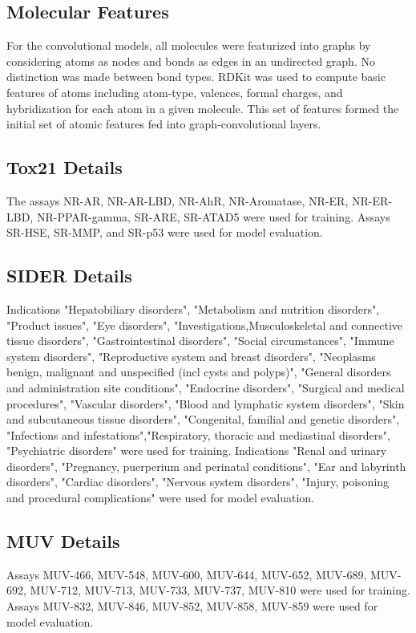 \documentclass[journal=jacsat,manuscript=article]{achemso}
\begin{document}
\subsection{Molecular Features}

For the convolutional models, all molecules were featurized into graphs by considering atoms as nodes and bonds as edges in an undirected graph. No distinction was made between bond types. RDKit \cite{landrum2016} was used to compute basic features of atoms including atom-type, valences, formal charges, and hybridization for each atom in a given molecule. This set  of features formed the initial set of atomic features fed into graph-convolutional layers. 

\subsection{Tox21 Details}

The assays NR-AR, NR-AR-LBD, NR-AhR, NR-Aromatase, NR-ER, NR-ER-LBD, NR-PPAR-gamma, SR-ARE, SR-ATAD5 were used for training. Assays SR-HSE, SR-MMP, and SR-p53 were used for model evaluation.

\subsection{SIDER Details}
Indications "Hepatobiliary disorders", "Metabolism and nutrition disorders", "Product issues", "Eye disorders", "Investigations,Musculoskeletal and connective tissue disorders", "Gastrointestinal disorders", "Social circumstances", "Immune system disorders", "Reproductive system and breast disorders", "Neoplasms benign, malignant and unspecified (incl cysts and polyps)", "General disorders and administration site conditions", "Endocrine disorders", "Surgical and medical procedures", "Vascular disorders", "Blood and lymphatic system disorders", "Skin and subcutaneous tissue disorders", "Congenital, familial and genetic disorders", "Infections and infestations","Respiratory, thoracic and mediastinal disorders", "Psychiatric disorders" were used for training. Indications "Renal and urinary disorders", "Pregnancy, puerperium and perinatal conditions", "Ear and labyrinth disorders", "Cardiac disorders", "Nervous system disorders", "Injury, poisoning and procedural complications" were used for model evaluation.

\subsection{MUV Details}
Assays MUV-466, MUV-548, MUV-600, MUV-644, MUV-652, MUV-689, MUV-692, MUV-712, MUV-713, MUV-733, MUV-737, MUV-810 were used for training. Assays MUV-832, MUV-846, MUV-852,  MUV-858, MUV-859 were used for model evaluation.




%
\end{document}
